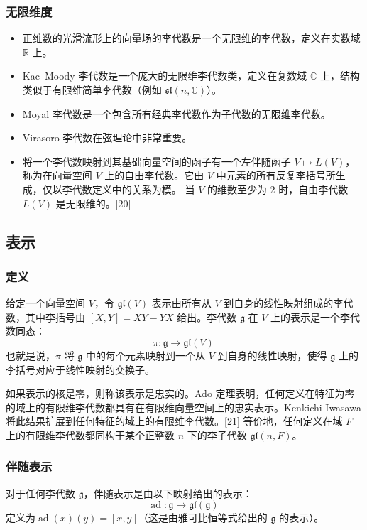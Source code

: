 \subsubsection{无限维度}  
\begin{itemize}
\item 正维数的光滑流形上的向量场的李代数是一个无限维的李代数，定义在实数域 \( \mathbb{R} \) 上。  
\item Kac–Moody 李代数是一个庞大的无限维李代数类，定义在复数域 \( \mathbb{C} \) 上，结构类似于有限维简单李代数（例如 \( \mathfrak{sl}(n, \mathbb{C}) \)）。  
\item Moyal 李代数是一个包含所有经典李代数作为子代数的无限维李代数。  
\item Virasoro 李代数在弦理论中非常重要。  
\item 将一个李代数映射到其基础向量空间的函子有一个左伴随函子 \( V \mapsto L(V) \)，称为在向量空间 \( V \) 上的自由李代数。它由 \( V \) 中元素的所有反复李括号所生成，仅以李代数定义中的关系为模。  
当 \( V \) 的维数至少为 2 时，自由李代数 \( L(V) \) 是无限维的。[20]
\end{itemize}
\subsection{表示}  
\subsubsection{定义}  
给定一个向量空间 \( V \)，令 \( \mathfrak{gl}(V) \) 表示由所有从 \( V \) 到自身的线性映射组成的李代数，其中李括号由 \( [X,Y] = XY - YX \) 给出。李代数 \( \mathfrak{g} \) 在 \( V \) 上的表示是一个李代数同态：
\[
\pi : \mathfrak{g} \to \mathfrak{gl}(V)~
\]
也就是说，\( \pi \) 将 \( \mathfrak{g} \) 中的每个元素映射到一个从 \( V \) 到自身的线性映射，使得 \( \mathfrak{g} \) 上的李括号对应于线性映射的交换子。

如果表示的核是零，则称该表示是忠实的。Ado 定理表明，任何定义在特征为零的域上的有限维李代数都具有在有限维向量空间上的忠实表示。Kenkichi Iwasawa 将此结果扩展到任何特征的域上的有限维李代数。[21] 等价地，任何定义在域 \( F \) 上的有限维李代数都同构于某个正整数 \( n \) 下的李子代数 \( \mathfrak{gl}(n,F) \)。
\subsubsection{伴随表示}  
对于任何李代数 \( \mathfrak{g} \)，伴随表示是由以下映射给出的表示：
\[
\operatorname{ad} : \mathfrak{g} \to \mathfrak{gl}(\mathfrak{g})~
\]
定义为\(\operatorname{ad}(x)(y) = [x, y]\)（这是由雅可比恒等式给出的 \( \mathfrak{g} \) 的表示）。
